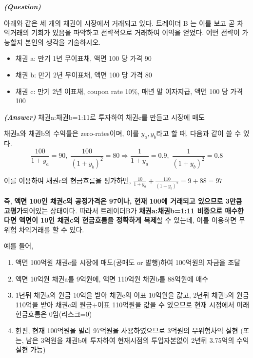 \documentclass[
  a4paper,
  DIV=11,
  numbers=noendperiod]{scrreprt}
\providecommand{\tightlist}{%
  \setlength{\itemsep}{0pt}\setlength{\parskip}{0pt}}\usepackage{longtable,booktabs,array}
\begin{document}

\textbf{\emph{(Question)}}

아래와 같은 세 개의 채권이 시장에서 거래되고 있다. 트레이더 B 는 이를
보고 곧 차익거래의 기회가 있음을 파악하고 전략적으로 거래하여 이익을
얻었다. 어떤 전략이 가능할지 본인의 생각을 기술하시오.

\begin{itemize}
\tightlist
\item
  채권 a: 만기 1년 무이표채, 액면 100 당 가격 90
\item
  채권 b: 만기 2년 무이표채, 액면 100 당 가격 80
\item
  채권 c: 만기 2년 이표채, coupon rate 10\%, 매년 말 이자지급, 액면 100
  당 가격 100
\end{itemize}

\textbf{\emph{(Answer)}} 채권a:채권b=1:11로 투자하여 채권c를 만들고
시장에 매도

채권a와 채권b의 수익률은 zero-rates이며, 이를 \(y_a,y_b\)라고 할 때,
다음과 같이 쓸 수 있다.
\[\frac{100}{1+y_a}=90,\; \frac{100}{(1+y_b)^2}=80 \Rightarrow \frac{1}{1+y_a}=0.9,\;\frac{1}{(1+y_b)^2}=0.8\]

이를 이용하여 채권c의 현금흐름을 평가하면,
\(\frac{10}{1+y_a}+\frac{110}{(1+y_b)^2}=9+88=97\)

즉, \textbf{액면 100인 채권c의 공정가격은 97이나, 현재 100에 거래되고
있으므로 3만큼 고평가}되어있는 상태이다. 따라서 트레이더B가
\textbf{채권a:채권b=1:11 비중으로 매수한다면 액면이 10인 채권c의
현금흐름을 정확하게 복제}할 수 있는데, 이를 이용하면 무위험 차익거래를
할 수 있다.

예를 들어,

\begin{enumerate}
\def\labelenumi{(\arabic{enumi})}
\item
  액면 100억원 채권c를 시장에 매도(공매도 or 발행)하여 100억원의 자금을
  조달
\item
  액면 10억원 채권a를 9억원에, 액면 110억원 채권b를 88억원에 매수
\item
  1년뒤 채권a의 원금 10억을 받아 채권c의 이표 10억원을 값고, 2년뒤
  채권b의 원금 110억을 받아 채권c의 원금+이표 110억원을 값을 수 있으므로
  현재 시점에서 미래현금흐름은 0임(리스크=0)
\item
  한편, 현재 100억원을 빌려 97억원을 사용하였으므로 3억원의 무위험차익
  실현 (또는, 남은 3억원을 채권b에 투자하여 현재시점의 투입자본없이
  2년뒤 3.75억의 수익 실현 가능)
\end{enumerate}
\end{document}
